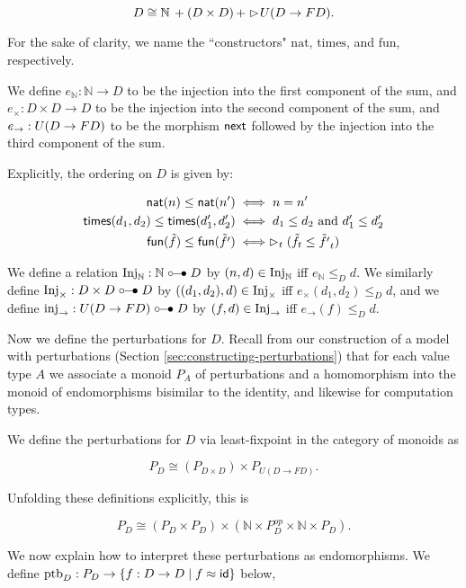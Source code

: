\[ D \cong \mathbb{N}\, + (D \times D)\, + \vartriangleright \hspace{-0.2em} U(D \to FD). \]


For the sake of clarity, we name the ``constructors" $\text{nat}$, $\text{times}$,
and $\text{fun}$, respectively.

We define $e_\mathbb{N} : \mathbb{N} \to D$ to be the injection into the first
component of the sum, and $e_\times : D \times D \to D$ to be the injection into
the second component of the sum, and $e_\to : U(D \to F D)$ to be the morphism
$\mathsf{next}$ followed by the injection into the third component of the sum.

Explicitly, the ordering on $D$ is given by:

\begin{align*}
    \mathsf{nat}(n) \le \mathsf{nat}(n') 
        &\iff n = n' \\
    \mathsf{times} (d_1, d_2) \le \mathsf{times} (d_1', d_2')
        &\iff d_1 \le d_2 \text{ and } d_1' \le d_2'\\
    \mathsf{fun}(\tilde{f}) \le \mathsf{fun}(\tilde{f'}) 
        &\iff \vartriangleright_t(\tilde{f}_t \le \tilde{f'}_t)
\end{align*}

We define a relation $\text{Inj}_\mathbb{N} : \mathbb{N} \mathrel{\circ\mkern-6mu-\mkern-6mu\bullet} D$ by
$(n, d) \in \text{Inj}_\mathbb{N}$ iff $e_\mathbb{N} \le_D d$.
We similarly define $\text{Inj}_\times : D \times D \mathrel{\circ\mkern-6mu-\mkern-6mu\bullet} D$ by
$((d_1, d_2), d) \in \text{Inj}_\times$ iff $e_\times(d_1, d_2) \le_D d$,
and we define $\text{inj}_\to : U(D \to F D) \mathrel{\circ\mkern-6mu-\mkern-6mu\bullet} D$ by
$(f, d) \in \text{Inj}_\to$ iff $e_\to(f) \le_D d$.

Now we define the perturbations for $D$.
Recall from our construction of a model with perturbations
(Section \ref{sec:constructing-perturbations}) that for each value
type $A$ we associate a monoid $P_A$ of perturbations
and a homomorphism into the monoid of endomorphisms bisimilar to the identity,
and likewise for computation types.

We define the perturbations for $D$ via least-fixpoint in the category of monoids as

\[ P_D \cong (P_{D \times D}) \times P_{U(D \to FD)}. \]

Unfolding these definitions explicitly, this is

\[ P_D \cong (P_D \times P_D) \times (\mathbb{N} \times P_D^{op} \times \mathbb{N} \times P_D). \]

We now explain how to interpret these perturbations as endomorphisms.
We define $\text{ptb}_D : P_D \to \{ f : D \to D \mid f \approx \mathsf{id} \}$ below,


